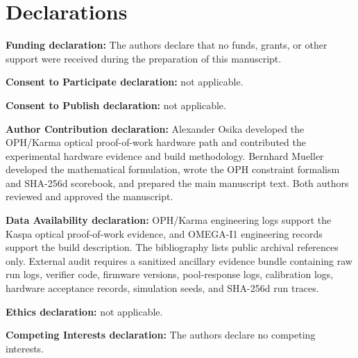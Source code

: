 \documentclass[11pt]{article}
\theoremstyle{definition}
\theoremstyle{remark}
\begin{document}
\section*{Declarations}

\noindent\textbf{Funding declaration:} The authors declare that no funds,
grants, or other support were received during the preparation of this
manuscript.

\noindent\textbf{Consent to Participate declaration:} not applicable.

\noindent\textbf{Consent to Publish declaration:} not applicable.

\noindent\textbf{Author Contribution declaration:} Alexander Osika developed
the OPH/Karma optical proof-of-work hardware path and contributed the
experimental hardware evidence and build methodology. Bernhard Mueller
developed the mathematical formulation, wrote the OPH constraint formalism and
SHA-256d scorebook, and prepared the main manuscript text. Both authors
reviewed and approved the manuscript.

\noindent\textbf{Data Availability declaration:} OPH/Karma engineering logs
support the Kaspa optical proof-of-work evidence, and OMEGA-I1 engineering
records support the build description. The bibliography lists public archival
references only. External audit requires a sanitized ancillary evidence bundle
containing raw run logs, verifier code, firmware versions, pool-response logs,
calibration logs, hardware acceptance records, simulation seeds, and SHA-256d
run traces.

\noindent\textbf{Ethics declaration:} not applicable.

\noindent\textbf{Competing Interests declaration:} The authors declare no
competing interests.
\end{document}
